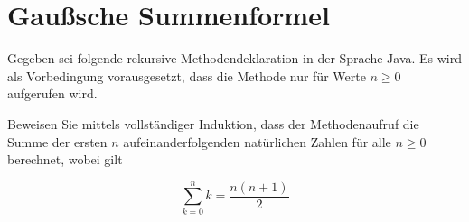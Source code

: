 \documentclass{bschlangaul-aufgabe}
\begin{document}
\let\m=\liInduktionMarkierung
\let\e=\liInduktionErklaerung


\section{Gaußsche Summenformel
}

Gegeben sei folgende rekursive Methodendeklaration in der Sprache Java.
Es wird als Vorbedingung vorausgesetzt, dass die Methode 
nur für Werte $n \geq 0$ aufgerufen wird.


\noindent
Beweisen Sie mittels vollständiger Induktion, dass der Methodenaufruf
 die Summe der ersten $n$ aufeinanderfolgenden
natürlichen Zahlen für alle $n \geq 0$ berechnet, wobei gilt

\begin{displaymath}
\sum_{k=0}^{n}k = \frac{n(n+1)}{2}
\end{displaymath}
\end{document}
